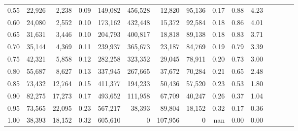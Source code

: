 \begin{tabular}{rrrcrrrrrrrrrrr}
0.55 &  22,926 &   2,238 &                                       0.09 &  149,082 &  456,528 &   12,820 &   95,136 &  0.17 &  0.88 &                         4.23 \\
0.60 &  24,080 &   2,552 &                                       0.10 &  173,162 &  432,448 &   15,372 &   92,584 &  0.18 &  0.86 &                         4.01 \\
0.65 &  31,631 &   3,446 &                                       0.10 &  204,793 &  400,817 &   18,818 &   89,138 &  0.18 &  0.83 &                         3.71 \\
0.70 &  35,144 &   4,369 &                                       0.11 &  239,937 &  365,673 &   23,187 &   84,769 &  0.19 &  0.79 &                         3.39 \\
0.75 &  42,321 &   5,858 &                                       0.12 &  282,258 &  323,352 &   29,045 &   78,911 &  0.20 &  0.73 &                         3.00 \\
0.80 &  55,687 &   8,627 &                                       0.13 &  337,945 &  267,665 &   37,672 &   70,284 &  0.21 &  0.65 &                         2.48 \\
0.85 &  73,432 &  12,764 &                                       0.15 &  411,377 &  194,233 &   50,436 &   57,520 &  0.23 &  0.53 &                         1.80 \\
0.90 &  82,275 &  17,273 &                                       0.17 &  493,652 &  111,958 &   67,709 &   40,247 &  0.26 &  0.37 &                         1.04 \\
0.95 &  73,565 &  22,095 &                                       0.23 &  567,217 &   38,393 &   89,804 &   18,152 &  0.32 &  0.17 &                         0.36 \\
1.00 &  38,393 &  18,152 &                                       0.32 &  605,610 &        0 &  107,956 &        0 &   nan &  0.00 &                         0.00 \\
\bottomrule
\end{tabular}
